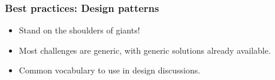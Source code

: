 \begin{frame}
	\frametitle{Best practices: Design patterns}
	\begin{itemize}[<+-| highlight@+>]
		\item Stand on the shoulders of giants!
		\item Most challenges are generic, with generic solutions already available.
		\item Common vocabulary to use in design discussions.
	\end{itemize}
\end{frame}

